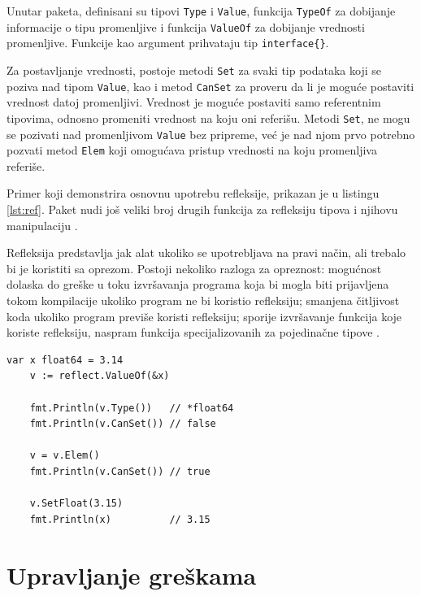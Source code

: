 \documentclass[12pt,oneside]{memoir}
\begin{document}
Unutar paketa, definisani su tipovi \texttt{Type} i \texttt{Value}, funkcija \texttt{TypeOf} za dobijanje informacije o tipu promenljive i funkcija \texttt{ValueOf} za dobijanje vrednosti promenljive. Funkcije kao argument prihvataju tip \texttt{interface\{\}}. 

Za postavljanje vrednosti, postoje metodi \texttt{Set} za svaki tip podataka koji se poziva nad tipom \texttt{Value}, kao i metod \texttt{CanSet} za proveru da li je moguće postaviti vrednost datoj promenljivi. Vrednost je moguće postaviti samo referentnim tipovima, odnosno promeniti vrednost na koju oni referišu. Metodi \texttt{Set}, ne mogu se pozivati nad promenljivom \texttt{Value} bez pripreme, već je nad njom prvo potrebno pozvati metod \texttt{Elem} koji omogućava pristup vrednosti na koju promenljiva referiše.  

Primer koji demonstrira osnovnu upotrebu refleksije, prikazan je u listingu \ref{lst:ref}. Paket nudi još veliki broj drugih funkcija za refleksiju tipova i njihovu manipulaciju \cite{reflect}.

Refleksija predstavlja jak alat ukoliko se upotrebljava na pravi način, ali trebalo bi je koristiti sa oprezom. Postoji nekoliko razloga za opreznost: mogućnost dolaska do greške u toku izvršavanja programa koja bi mogla biti prijavljena tokom kompilacije ukoliko program ne bi koristio refleksiju; smanjena čitljivost koda ukoliko program previše koristi refleksiju; sporije izvršavanje funkcija koje koriste refleksiju, naspram funkcija specijalizovanih za pojedinačne tipove \cite{bookGoProg}.

 \begin{center}
\begin{lstlisting}[caption=Primer koji demonstrira osnovnu upotrebu refleksije, label={lst:ref},  backgroundcolor=\color{background}]
	var x float64 = 3.14
	v := reflect.ValueOf(&x) 
	
	fmt.Println(v.Type())	// *float64
	fmt.Println(v.CanSet())	// false
	
	v = v.Elem()
	fmt.Println(v.CanSet())	// true
	
	v.SetFloat(3.15)
	fmt.Println(x)			// 3.15
\end{lstlisting}
\end{center}

\section{Upravljanje greškama} \label{error}
\end{document}
